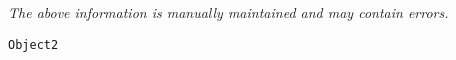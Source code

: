 \label{pkg:object2}

{\tiny \it The above information is manually maintained and may contain errors.}
\begin{verbatim}
Object2
\end{verbatim}
